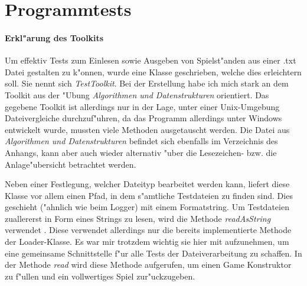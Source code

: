 \section{Programmtests}
\FloatBarrier

\paragraph{Erkl"arung des Toolkits}
Um effektiv Tests zum Einlesen sowie Ausgeben von Spielst"anden aus einer .txt Datei gestalten zu k"onnen, wurde eine Klasse geschrieben, welche dies erleichtern soll. Sie nennt sich \emph{TestToolkit}. Bei der Erstellung habe ich mich stark an dem Toolkit aus der "Ubung \emph{Algorithmen und Datenstrukturen} orientiert. Das gegebene Toolkit ist allerdings nur in der Lage, unter einer Unix-Umgebung Dateivergleiche durchzuf"uhren, da das Programm allerdings unter Windows entwickelt wurde, mussten viele Methoden ausgetauscht werden. Die Datei aus \emph{Algorithmen und Datenstrukturen} befindet sich ebenfalls im Verzeichnis des Anhangs, kann aber auch wieder alternativ "uber die Lesezeichen- bzw. die Anlage"ubersicht betrachtet werden. 


Neben einer Festlegung, welcher Dateityp bearbeitet werden kann, liefert diese Klasse vor allem einen Pfad, in dem s"amtliche Testdateien zu finden sind. Dies geschieht ("ahnlich wie beim Logger) mit einem Formatstring. Um Testdateien zuallererst in Form eines Strings zu lesen, wird die Methode \emph{readAsString} verwendet . Diese verwendet allerdings nur die bereits implementierte Methode der Loader-Klasse. Es war mir trotzdem wichtig sie hier mit aufzunehmen, um eine gemeinsame Schnittstelle f"ur alle Tests der Dateiverarbeitung zu schaffen. In der Methode \emph{read} wird diese Methode aufgerufen, um einen Game Konstruktor zu f"ullen und ein vollwertiges Spiel zur"uckzugeben. 

